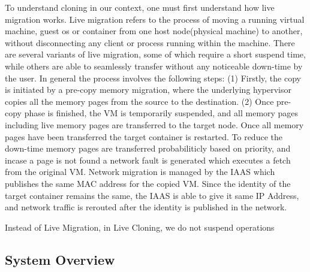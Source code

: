 To understand cloning in our context, one must first understand how live migration works. 
Live migration refers to the process of moving a running virtual machine, guest os or container from one host node(physical machine) to another, without disconnecting any client or process running within the machine. 
There are several variants of live migration, some of which require a short suspend time, while others are able to seamlessly transfer without any noticeable down-time by the user.
In general the process involves the following steps: (1) Firstly, the copy is initiated by a pre-copy memory migration, where the underlying hypervisor copies all the memory pages from the source to the destination. (2) Once pre-copy phase is finished, the VM is temporarily suspended, and all memory pages including live memory pages are transferred to the target node. 
Once all memory pages have been transferred the target container is restarted. 
To reduce the down-time memory pages are transferred probabiliticly based on priority, and incase a page is not found a network fault is generated which executes a fetch from the original VM.
Network migration is managed by the IAAS which publishes the same MAC address for the copied VM. 
Since the identity of the target container remains the same, the IAAS is able to give it same IP Address, and network traffic is rerouted after the identity is published in the network.

Instead of Live Migration, in Live Cloning, we do not suspend operations 

\subsection{System Overview}
